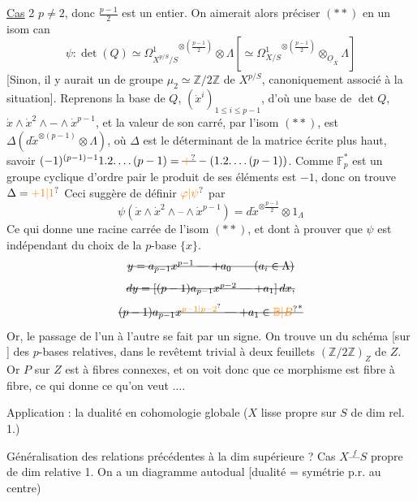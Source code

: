 \uline{Cas} 2 \quad $p\ne2$, donc $\frac{p-1}{2}$ est un entier. On aimerait alors préciser $(\ast\ast)$ en un isom can
\[
 \psi:\det(Q)\simeq{\Omega^1_{X^{p/S}/S}}^{\otimes(\frac{p-1}{2})}\otimes\Lambda
 \left[\simeq{\Omega^1_{X/S}}^{\otimes(\frac{p-1}{2})}\otimes_{\underline O_X}\Lambda\right]
\]
[Sinon, il y aurait un  de groupe $\mu_2\simeq\mathbb Z/2\mathbb Z$ de $X^{p/S}$, canoniquement associé à la situation]. Reprenons la base de $Q$, $(\dot x^i)_{1\le i\le p-1}$,  d'où une base de  $\det Q$, $\dot x\wedge\dot x^2\wedge-\wedge\dot x^{p-1}$, et la valeur de son carré, par l'isom $(\ast\ast)$, est $\Delta(d\widetilde x^{\otimes(p-1)}\otimes\Lambda)$, où $\Delta$ est le déterminant de la matrice écrite plus haut, savoir $(-1)^{(p-1)-1}1.2.\ldots(p-1)=\deleted{\unsure{+}}-(1.2.\ldots(p-1))$. Comme $\mathbb F_p^\ast$ est un groupe cyclique d'ordre  pair  le produit de ses éléments est $-1$, donc on trouve $\Delta=\unsure{+1|1}$
Ceci suggère  de définir $\unsure{\varphi|\psi}$ par
\[
 \boxed{\psi(\dot x\wedge\dot x^2\wedge\text{--}\wedge\dot x^{p-1})
 =d\widetilde x^{\otimes\frac{p-1}{2}}\otimes 1_\Lambda}
 \tag*{($\ast\ast\ast$)}
\]
Ce qui donne une racine carrée de l'isom $(\ast\ast)$, et dont  à prouver que $\psi$ est indépendant du choix de la $p$-base $\{x\}$. 
\[
 \deleted{y=a_{p-1}x^{p-1}\mathrel{\text{---}}+a_0\qquad(a_i\in\Lambda)}
\]
\[
 \deleted{dy=[(p-1)a_{p-1}x^{p-2}\mathrel{\text{---}}+a_1]\,dx,}
\]
\[
 \deleted{(p-1)a_{p-1}x^{\unsure{p-1|p-2}}\mathrel{\text{---}}+a_1\in{\unsure{\mathbb B|B}}^\ast}
\]
Or, le passage de l'un à l'autre se fait par un signe. On trouve un   du schéma  [sur \deleted{\unsure{$\Lambda$}} ] des $p$-bases relatives, dans le revêtemt trivial à deux feuillets $(\mathbb Z/2\mathbb Z)_Z$ de $Z$.  Or  $P$ sur $Z$ est à fibres connexes, et on voit donc que  ce morphisme est  fibre à fibre, ce qui donne ce qu'on veut $\ldots$.

Application : la dualité en cohomologie globale ($X$ lisse propre sur $S$ de dim rel. 1.)

 Généralisation des relations précédentes à la dim supérieure ?
Cas $X\mathrel{\overset{f}{\text{---}}}S$ propre  de dim relative 1. On a un diagramme autodual [dualité = symétrie p.r. au centre)

